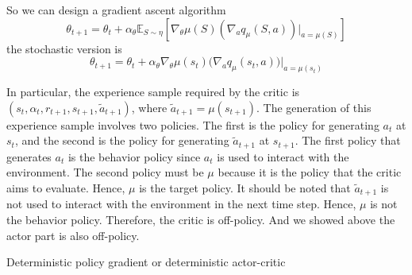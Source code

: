 \documentclass[10pt]{elegantbook}
\begin{document}
So we can design a gradient ascent algorithm
\[
    \theta_{t+1}=\theta_{t}+\alpha_{\theta}\mathbb{E}_{S\sim\eta}\left[\nabla_{\theta}\mu(S)\left(\nabla_{a}q_{\mu}(S,a)\right)|_{a=\mu(S)}\right]
\]
the stochastic version is
\[
    \theta_{t+1}=\theta_{t}+\alpha_{\theta}\nabla_{\theta}\mu(s_{t})\bigl(\nabla_{a}q_{\mu}(s_{t},a)\bigr)\bigl|_{a=\mu(s_{t})}
\]

In particular, the experience sample required by the critic is $\left(s_{t},\alpha_{t},r_{t+1},s_{t+1},\tilde{a}_{t+1}\right)$, where $\tilde{a}_{t+1} = \mu(s_{t+1})$.
The generation of this experience sample involves two policies. The first is the policy
for generating $a_t$ at $s_t$, and the second is the policy for generating $\tilde{a}_{t+1}$ at $s_{t+1}$. The
first policy that generates $a_t$ is the behavior policy since $a_t$ is used to interact with the
environment. The second policy must be $\mu$ because it is the policy that the critic aims
to evaluate. Hence, $\mu$ is the target policy. It should be noted that $\tilde{a}_{t+1}$ is not used to
interact with the environment in the next time step. Hence, $\mu$ is not the behavior policy.
Therefore, the critic is off-policy. And we showed above the actor part is also off-policy.

\vspace{\baselineskip}

\begin{algorithm}[H]
\caption{Deterministic policy gradient or deterministic actor-critic}

\end{algorithm}

\vspace{\baselineskip}
\end{document}
